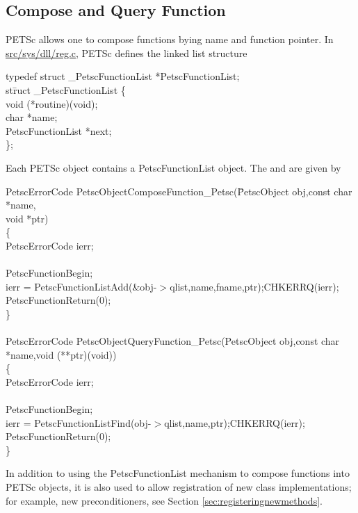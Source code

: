 \documentclass[twoside,12pt]{../sty/report_petsc}
\begin{document}
\subsection{Compose and Query Function}

PETSc allows one to compose functions bying name and function pointer. In \href{http://www.mcs.anl.gov/petsc/petsc-dev/src/sys/dll/reg.c.html}{src/sys/dll/reg.c},
PETSc defines the linked list structure

\begin{tabbing}
typedef struct \_PetscFunctionList *PetscFunctionList;\\
st\=ruct \_PetscFunctionList \{\\
 \>void   (*routine)(void);\\
 \>char   *name;  \\
 \>PetscFunctionList  *next;\\
\};
\end{tabbing}

Each PETSc object contains a PetscFunctionList object. The  and
 are given by

\begin{tabbing}
PetscErrorCode PetscObjectComposeFunction\_Petsc(\=PetscObject obj,const char *name,\\
   \> void *ptr)\\
\{\\
  PetscErrorCode ierr;\\
\\
  PetscFunctionBegin;\\
  ierr = PetscFunctionListAdd(\&obj-$>$qlist,name,fname,ptr);CHKERRQ(ierr);\\
  PetscFunctionReturn(0);\\
\}\\
\\
PetscErrorCode PetscObjectQueryFunction\_Petsc(PetscObject obj,const char *name,void (**ptr)(void))\\
\{\\
  PetscErrorCode ierr;\\
\\
  PetscFunctionBegin;\\
  ierr = PetscFunctionListFind(obj-$>$qlist,name,ptr);CHKERRQ(ierr);\\
  PetscFunctionReturn(0);\\
\}
\end{tabbing}

In addition to using the PetscFunctionList mechanism to compose functions into PETSc objects, it is
also used to allow registration of new class implementations; for example, new
preconditioners, see Section \ref{sec:registeringnewmethods}.
\end{document}
